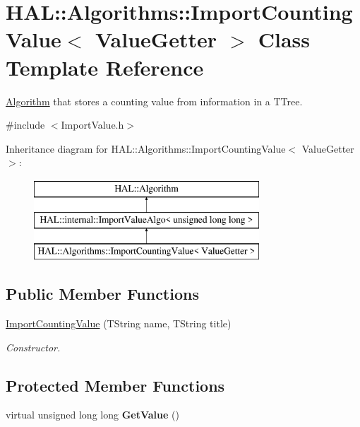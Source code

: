 \hypertarget{class_h_a_l_1_1_algorithms_1_1_import_counting_value}{\section{H\+A\+L\+:\+:Algorithms\+:\+:Import\+Counting\+Value$<$ Value\+Getter $>$ Class Template Reference}
\label{class_h_a_l_1_1_algorithms_1_1_import_counting_value}
}


\hyperlink{class_h_a_l_1_1_algorithm}{Algorithm} that stores a counting value from information in a T\+Tree.  




{\ttfamily \#include $<$Import\+Value.\+h$>$}

Inheritance diagram for H\+A\+L\+:\+:Algorithms\+:\+:Import\+Counting\+Value$<$ Value\+Getter $>$\+:\begin{figure}[H]
\begin{center}
\leavevmode
\includegraphics[height=3.000000cm]{class_h_a_l_1_1_algorithms_1_1_import_counting_value}
\end{center}
\end{figure}
\subsection*{Public Member Functions}
\begin{DoxyCompactItemize}
\item 
\hyperlink{class_h_a_l_1_1_algorithms_1_1_import_counting_value_a9abeea49a97ffe789dc1e70a2436b027}{Import\+Counting\+Value} (T\+String name, T\+String title)
\begin{DoxyCompactList}\small\item\em Constructor. \end{DoxyCompactList}\end{DoxyCompactItemize}
\subsection*{Protected Member Functions}
\begin{DoxyCompactItemize}
\item 
\hypertarget{class_h_a_l_1_1_algorithms_1_1_import_counting_value_a722af79d54a2c0c475255aea4cd6a6ee}{virtual unsigned long long {\bfseries Get\+Value} ()}\label{class_h_a_l_1_1_algorithms_1_1_import_counting_value_a722af79d54a2c0c475255aea4cd6a6ee}

\end{DoxyCompactItemize}
